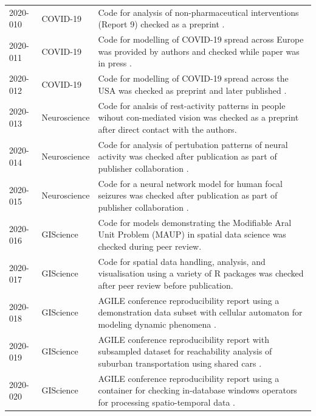 \documentclass[12pt]{article}
\begin{document}
\begin{table}
\begin{tabular}{llp{12cm}}
    2020-010  \cite{cert-2020-010} & COVID-19 & Code for analysis of non-pharmaceutical interventions (Report 9) checked as a preprint \cite{ferguson_report_2020}. \\ %
    2020-011  \cite{cert-2020-011} & COVID-19 & Code for modelling of COVID-19 spread across Europe was provided by authors and checked while paper was in press \cite{flaxman_estimating_2020}. \\
    2020-012  \cite{cert-2020-012} & COVID-19 & Code for modelling of COVID-19 spread across the USA was checked as preprint \cite{unwin_report_2020} and later published \cite{unwin_state-level_2020}. \\
    2020-013  \cite{cert-2020-013} & Neuroscience & Code for analsis of rest-activity patterns in people wihout con-mediated vision was checked as a preprint \cite{Spitschan2020.06.02.129502} after direct contact with the authors. \\ %
    2020-014  \cite{cert-2020-014} & Neuroscience & Code for analysis of pertubation patterns of neural activity was checked after publication as part of publisher collaboration \cite{Sadeh2020}. \\ %
    2020-015  \cite{cert-2020-015} & Neuroscience & Code for a neural network model for human focal seizures was checked after publication as part of publisher collaboration \cite{Liou2020}. \\ %
    2020-016  \cite{cert-2020-016} & GIScience & Code for models demonstrating the Modifiable Aral Unit Problem (MAUP) in spatial data science \cite{Brunsdon2020} was checked during peer review. \\ %
    2020-017  \cite{cert-2020-017} & GIScience & Code for spatial data handling, analysis, and visualisation using a variety of R packages \cite{Bivand2020} was checked after peer review before publication. \\ %
    2020-018  \cite{cert-2020-018} & GIScience & AGILE conference reproducibility report using a demonstration data subset with cellular automaton for modeling dynamic phenomena \cite{Hojati2020}. \\ %
    2020-019  \cite{cert-2020-019} & GIScience & AGILE conference reproducibility report with subsampled dataset for reachability analysis of suburban transportation using shared cars \cite{Illium2020}. \\
    2020-020  \cite{cert-2020-020} & GIScience & AGILE conference reproducibility report using a container for checking in-database windows operators for processing spatio-temporal data \cite{Werner2020}. \\ %

\end{tabular}
\end{table}
\end{document}
